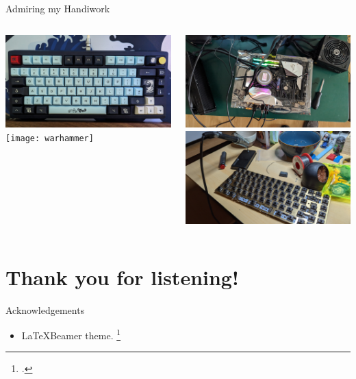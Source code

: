 \documentclass[10pt]{beamer}
\begin{document}
  \begin{frame}{Admiring my Handiwork}
    \begin{columns}
        \includegraphics[width=\textwidth]{keyboard}\\
        \vspace{0.2cm}
        \texttt{[image: warhammer]}

        \includegraphics[width=\textwidth]{pc}\\
        \vspace{0.2cm}
        \includegraphics[width=\textwidth]{soldering}
    \end{columns}
  \end{frame}

  \section*{Thank you for listening!}
  \begin{frame}{Acknowledgements}
    \begin{itemize}
      \item \LaTeX Beamer theme. \footcite{mtheme}
    \end{itemize}
  \end{frame}

  \begin{frame}
    \printbibliography
  \end{frame}
\end{document}

